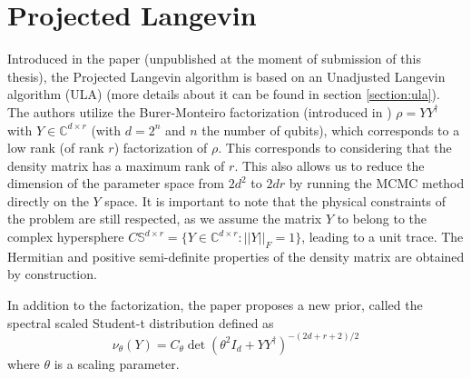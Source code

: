\documentclass[12pt]{memoir}
\begin{document}
\newpage
\section{Projected Langevin}\label{section:projected-langevin}

Introduced in the \cite{meth:bayesian:Langevin:ACMT2024} paper (unpublished at the moment of submission of this thesis), the Projected Langevin algorithm is based on an Unadjusted Langevin algorithm (ULA) (more details about it can be found in section \ref{section:ula}). The authors utilize the Burer-Monteiro factorization (introduced in \cite{proj-langevin:Burer2003}) $\rho = Y Y^\dagger$ with $Y \in \mathbb{C}^{d \times r}$ (with $d=2^n$ and $n$ the number of qubits), which corresponds to a low rank (of rank $r$) factorization of $\rho$. This corresponds to considering that the density matrix has a maximum rank of $r$. This also allows us to reduce the dimension of the parameter space from $2d^2$ to $2dr$ by running the MCMC method directly on the $Y$ space. It is important to note that the physical constraints of the problem are still respected, as we assume the matrix $Y$ to belong to the complex hypersphere $C \mathbb{S}^{d\times r} = \{ Y \in \mathbb{C}^{d\times r}: ||Y||_F = 1\}$, leading to a unit trace. The Hermitian and positive semi-definite properties of the density matrix are obtained by construction.\medbreak

In addition to the factorization, the paper proposes a new prior, called the spectral scaled Student-t distribution defined as
\begin{equation}    
\nu_{\theta} (Y) = C_\theta \det(\theta^2I_d + YY^\dagger)^{-(2d+r+2)/2}
\end{equation}
where $\theta$ is a scaling parameter.\medbreak
\end{document}
